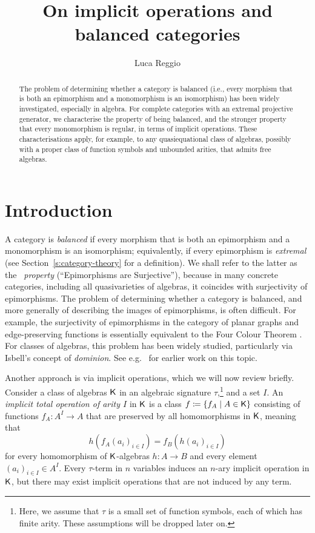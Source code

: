 \documentclass[a4paper,10pt,reqno]{amsart}
\title{On implicit operations and balanced categories}
\author{Luca Reggio}
\theoremstyle{definition}
\theoremstyle{remark}
\begin{document}
\begin{abstract}
The problem of determining whether a category is balanced (i.e., every morphism that is both an epimorphism and a monomorphism is an isomorphism) has been widely investigated, especially in algebra.
For complete categories with an extremal projective generator, we characterise the property of being balanced, and the stronger property that every monomorphism is regular, in terms of implicit operations. These characterisations apply, for example, to any quasiequational class of algebras, possibly with a proper class of function symbols and unbounded arities, that admits free algebras.
\end{abstract}


\maketitle


\section{Introduction}\label{s:introduction}
A category is \emph{balanced} if every morphism that is both an epimorphism and a monomorphism is an isomorphism; equivalently, if every epimorphism is \emph{extremal} (see Section~\ref{s:category-theory} for a definition). We shall refer to the latter as the \emph{\ES~property} (``Epimorphisms are Surjective''), because in many concrete categories, including all quasivarieties of algebras, it coincides with surjectivity of epimorphisms. The problem of determining whether a category is balanced, and more generally of describing the images of epimorphisms, is often difficult. For example, the surjectivity of epimorphisms in the category of planar graphs and edge-preserving functions is essentially equivalent to the Four Colour Theorem \cite{Fawcett1986}. For classes of algebras, this problem has been widely studied, particularly via Isbell's concept of \emph{dominion}. See e.g.\ \cite{Isbell1966,HI1967,Storrer1968} for earlier work on this topic.


Another approach is via implicit operations, which we will now review briefly.
%
Consider a class of algebras ${\sf K}$ in an algebraic signature $\tau$,\footnote{Here, we assume that $\tau$ is a small set of function symbols, each of which has finite arity. These assumptions will be dropped later on.} and a set $I$. An \emph{implicit total operation of arity $I$} in ${\sf K}$ is a class $f\coloneqq \{f_{A}\mid A\in {\sf K}\}$ consisting of functions $f_{A}\colon A^{I}\to A$ that are preserved by all homomorphisms in ${\sf K}$, meaning that
\[
h(f_{A}(a_{i})_{i\in I}) = f_{B}(h(a_{i})_{i\in I})
\]
for every homomorphism of ${\sf K}$-algebras $h\colon A\to B$ and every element $(a_{i})_{i\in I}\in A^{I}$. Every $\tau$-term in $n$ variables induces an $n$-ary implicit operation in ${\sf K}$, but there may exist implicit operations that are not induced by any term. 
%
\end{document}
